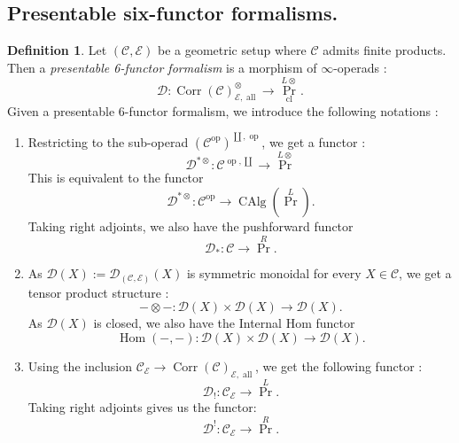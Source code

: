 \documentclass[14pt]{article}
\theoremstyle{definition}
\newtheorem{definition}[theorem]{Definition}
\newcommand{\CrrCopEal}{\op{Corr}(\Ca)^{\otimes}_{\E,\op{all}}}
\newcommand{\CrrCpEal}{\op{Corr}(\Ca)_{\E,\op{all}}}
\newcommand{\Ccc}{(\Ca^{\op{op}})^{\coprod,\op{op}}}
\newcommand{\E}{\mathcal{E}}
\newcommand{\D}{\mathcal{D}}
\newcommand{\op}[1]{\operatorname{#1}}
\newcommand{\Ca}{\mathcal{C}}
\numberwithin{subsection}{section}
\begin{document}
\subsection{Presentable six-functor formalisms.}
       \begin{definition}
    Let $(\Ca,\E)$ be a geometric setup where $\Ca$ admits finite products. Then a \textit{presentable 6-functor formalism} is a morphism of $\infty$-operads :
    \begin{equation*}
        \D : \CrrCopEal \to \op{Pr}^{L\otimes}_{\op{cl}}.
    \end{equation*}
    Given a presentable 6-functor formalism, we introduce the following notations :
    \begin{enumerate}
        \item Restricting to the sub-operad $\Ccc$, we get a functor :
        \begin{equation*}
            \D^{*\otimes} : \Ca^{\op{op},\coprod} \to \op{Pr}^{L\otimes}
        \end{equation*}
        This is equivalent to the functor 
        \begin{equation*}
            \D^{*\otimes} : \Ca^{\op{op}} \to \op{CAlg}(\op{Pr}^L).
        \end{equation*} Taking right adjoints, we also have the pushforward functor 
        \begin{equation*}
            \D_* : \Ca \to \op{Pr}^R.
        \end{equation*}
        \item As $\D(X):=\D_{(\Ca,\E)}(X)$ is symmetric monoidal for every $X \in \Ca$, we get a tensor product structure :
        \begin{equation*}
            - \otimes - : \D(X) \times \D(X) \to \D(X).
        \end{equation*} As $\D(X)$ is closed, we also have the Internal Hom functor 
        \begin{equation*}
            \op{Hom}(-,-) : \D(X) \times \D(X) \to \D(X).
        \end{equation*}
        \item Using the inclusion $\Ca_{\E} \to \CrrCpEal$, we get the following functor :
        \begin{equation*}
           \D_!: \Ca_{\E} \to \op{Pr}^L.
        \end{equation*}
        Taking right adjoints gives us the functor:
        \begin{equation}
            \D^! : \Ca_{\E} \to \op{Pr}^R.
        \end{equation}
    \end{enumerate}
\end{definition}
\end{document}
